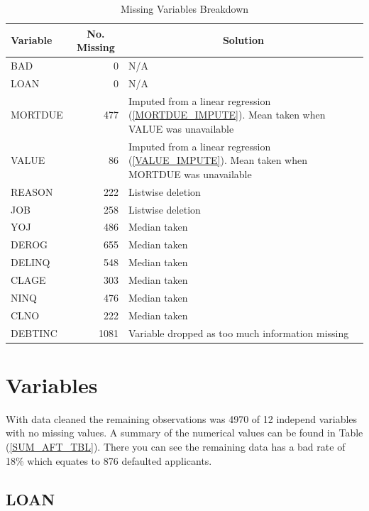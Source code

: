 \begin{table}[ht]
	\centering
	\renewcommand{\arraystretch}{1.25}
	\begin{tabular}{l r p{9cm}}
	\hline
	Variable & \multicolumn{1}{c}{No. Missing} & \multicolumn{1}{c}{Solution}\\ 
	\hline
	BAD & 0 & N/A\\
	LOAN & 0 & N/A \\
	MORTDUE & 477 & Imputed from a linear regression (\ref{MORTDUE_IMPUTE}). Mean taken when VALUE was unavailable \\
	VALUE & 86 & Imputed from a linear regression (\ref{VALUE_IMPUTE}). Mean taken when MORTDUE was unavailable \\
	REASON & 222 & Listwise deletion \\
	JOB & 258 & Listwise deletion \\
	YOJ & 486 & Median taken\\
	DEROG & 655 & Median taken \\
	DELINQ & 548 & Median taken\\
	CLAGE & 303 & Median taken \\
	NINQ & 476 & Median taken\\
	CLNO & 222 & Median taken \\
	DEBTINC & 1081 & Variable dropped as too much information missing\\
	\end{tabular}
	\caption{Missing Variables Breakdown \label{DataCleanSummary}}
\end{table}

\section{Variables}\label{sec:variables}

With data cleaned the remaining observations was 4970 of 12 independ variables with no missing values. A summary of the numerical values can be found in Table (\ref{SUM_AFT_TBL}). There you can see the remaining data has a bad rate of 18\% which equates to 876 defaulted applicants.

\subsection*{LOAN}

